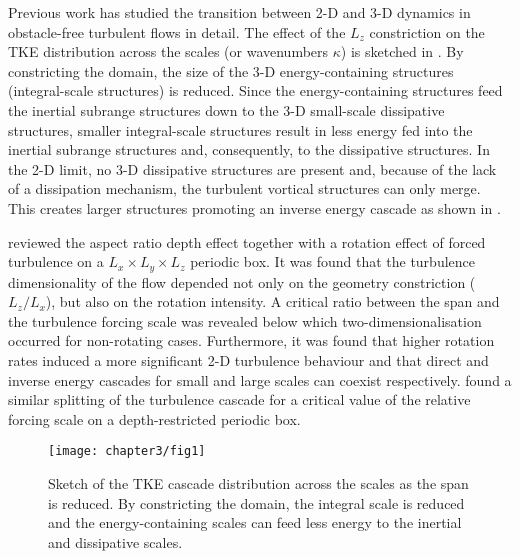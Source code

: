 \documentclass[../main.tex]{subfiles}
\begin{document}
Previous work has studied the transition between 2-D and 3-D dynamics in obstacle-free turbulent flows in detail.
The effect of the $L_z$ constriction on the TKE distribution across the scales (or wavenumbers $\kappa$) is sketched in .
By constricting the domain, the size of the 3-D energy-containing structures (integral-scale structures) is reduced.
Since the energy-containing structures feed the inertial subrange structures down to the 3-D small-scale dissipative structures, smaller integral-scale structures result in less energy fed into the inertial subrange structures and, consequently, to the dissipative structures.
In the 2-D limit, no 3-D dissipative structures are present and, because of the lack of a dissipation mechanism, the turbulent vortical structures can only merge.
This creates larger structures promoting an inverse energy cascade as shown in \cite{Kraichnan1967, Leith1968, Batchelor1969}.

\cite{Smith1996} reviewed the aspect ratio depth effect together with a rotation effect of forced turbulence on a $L_x \times L_y \times L_z$ periodic box.
It was found that the turbulence dimensionality of the flow depended not only on the geometry constriction ($L_z/L_x$), but also on the rotation intensity.
A critical ratio between the span and the turbulence forcing scale was revealed below which two-dimensionalisation occurred for non-rotating cases.
Furthermore, it was found that higher rotation rates induced a more significant 2-D turbulence behaviour and that direct and inverse energy cascades for small and large scales can coexist respectively.
\cite{Celani2010} found a similar splitting of the turbulence cascade for a critical value of the relative forcing scale on a depth-restricted periodic box.

\begin{figure}
\vspace*{0.2cm}
  \centerline{\texttt{[image: chapter3/fig1]}}
  \caption{Sketch of the TKE cascade distribution across the scales as the span is reduced.
By constricting the domain, the integral scale is reduced and the energy-containing scales can feed less energy to the inertial and dissipative scales.}
\label{fig:ek_sketch}
\end{figure}
\end{document}

